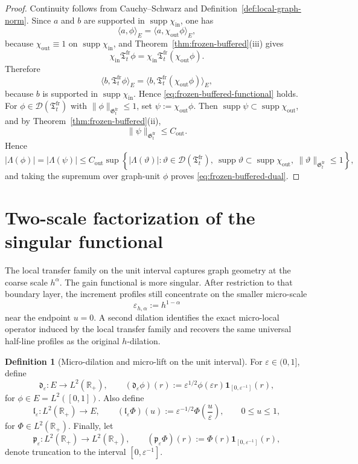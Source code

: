\documentclass[11pt,a4paper]{amsart}
\theoremstyle{plain}
\theoremstyle{definition}
\newtheorem{definition}[theorem]{Definition}
\theoremstyle{remark}
\newcommand{\R}{\mathbb{R}}
\newcommand{\one}{\mathbf 1}
\begin{document}
\begin{proof}
Continuity follows from Cauchy--Schwarz and Definition~\ref{def:local-graph-norm}. Since \(a\) and
\(b\) are supported in \(\operatorname{supp}\chi_{\mathrm{in}}\), one has
\[
\langle a,\phi\rangle_E=\langle a,\chi_{\mathrm{out}}\phi\rangle_E,
\]
because \(\chi_{\mathrm{out}}\equiv1\) on \(\operatorname{supp}\chi_{\mathrm{in}}\), and
Theorem~\ref{thm:frozen-buffered}(iii) gives
\[
\chi_{\mathrm{in}}\mathfrak T_t^{\mathrm{fr}}\phi
=
\chi_{\mathrm{in}}\mathfrak T_t^{\mathrm{fr}}(\chi_{\mathrm{out}}\phi).
\]
Therefore
\[
\langle b,\mathfrak T_t^{\mathrm{fr}}\phi\rangle_E
=
\langle b,\mathfrak T_t^{\mathrm{fr}}(\chi_{\mathrm{out}}\phi)\rangle_E,
\]
because \(b\) is supported in \(\operatorname{supp}\chi_{\mathrm{in}}\). Hence
\eqref{eq:frozen-buffered-functional} holds. For \(\phi\in\mathcal D(\mathfrak T_t^{\mathrm{fr}})\)
with \(\|\phi\|_{\mathfrak G_t^{\mathrm{fr}}}\le1\), set \(\psi:=\chi_{\mathrm{out}}\phi\). Then
\(\operatorname{supp}\psi\subset \operatorname{supp}\chi_{\mathrm{out}}\), and by Theorem~\ref{thm:frozen-buffered}(ii),
\[
\|\psi\|_{\mathfrak G_t^{\mathrm{fr}}}\le C_{\mathrm{out}}.
\]
Hence
\[
|\Lambda(\phi)|
=
|\Lambda(\psi)|
\le
C_{\mathrm{out}}
\sup\left\{
|\Lambda(\vartheta)|:
\vartheta\in\mathcal D(\mathfrak T_t^{\mathrm{fr}}),\
\operatorname{supp}\vartheta\subset \operatorname{supp}\chi_{\mathrm{out}},\
\|\vartheta\|_{\mathfrak G_t^{\mathrm{fr}}}\le 1
\right\},
\]
and taking the supremum over graph-unit \(\phi\) proves \eqref{eq:frozen-buffered-dual}.
\end{proof}

\section{Two-scale factorization of the singular functional}\label{sec:two-scale}

The local transfer family on the unit interval captures graph geometry at the coarse scale
\(h^\alpha\).  The gain functional is more singular.  After restriction to that boundary layer, the
increment profiles still concentrate on the smaller micro-scale
\[
\varepsilon_{h,\alpha}:=h^{1-\alpha}
\]
near the endpoint \(u=0\).  A second dilation identifies the exact micro-local operator induced by
the local transfer family and recovers the same universal half-line profiles as the original
\(h\)-dilation.

\begin{definition}[Micro-dilation and micro-lift on the unit interval]
\label{def:micro-dilation}
For \(\varepsilon\in(0,1]\), define
\[
\mathfrak d_\varepsilon:E\to L^2(\R_+),
\qquad
(\mathfrak d_\varepsilon\phi)(r)
:=
\varepsilon^{1/2}\phi(\varepsilon r)\one_{[0,\varepsilon^{-1}]}(r),
\]
for \(\phi\in E=L^2([0,1])\). Also define
\[
\mathfrak l_\varepsilon:L^2(\R_+)\to E,
\qquad
(\mathfrak l_\varepsilon\Phi)(u)
:=
\varepsilon^{-1/2}\Phi\!\left(\frac{u}{\varepsilon}\right),
\qquad 0\le u\le 1,
\]
for \(\Phi\in L^2(\R_+)\). Finally, let
\[
\mathfrak p_\varepsilon:L^2(\R_+)\to L^2(\R_+),
\qquad
(\mathfrak p_\varepsilon\Phi)(r):=\Phi(r)\one_{[0,\varepsilon^{-1}]}(r),
\]
denote truncation to the interval \([0,\varepsilon^{-1}]\).
\end{definition}
\end{document}
